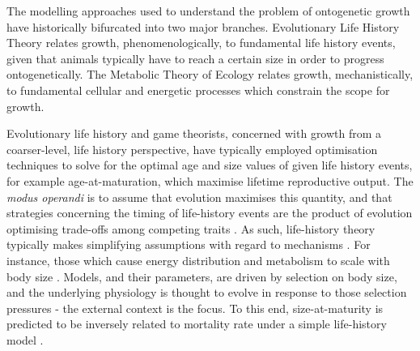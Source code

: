 \documentclass[a4paper]{article} %
\begin{document}
    The modelling approaches used to understand the problem of ontogenetic growth have historically bifurcated into two major branches. Evolutionary Life History Theory relates growth, phenomenologically, to fundamental life history events, given that animals typically have to reach a certain size in order to progress ontogenetically. The Metabolic Theory of Ecology relates growth, mechanistically, to fundamental cellular and energetic processes which constrain the scope for growth.
        
    Evolutionary life history and game theorists, concerned with growth from a coarser-level, life history perspective, have typically employed optimisation techniques to solve for the optimal age and size values of given life history events, for example age-at-maturation, which maximise lifetime reproductive output. The \textit{modus operandi} is to assume that evolution maximises this quantity, and that strategies concerning the timing of life-history events are the product of evolution optimising trade-offs among competing traits \autocite{Day1997, Stearns1989, stearns1992evolution}. As such, life-history theory typically makes simplifying assumptions with regard to mechanisms \autocite{Day1997, Kozowski1987-indeterminate}. For instance, those which cause energy distribution and metabolism to scale with body size \autocite{peters1983,Werner1988,West1997,brown2000-scaling-book}. Models, and their parameters, are driven by selection on body size, and the underlying physiology is thought to evolve in response to those selection pressures - the external context is the focus. To this end, size-at-maturity is predicted to be inversely related to mortality rate under a simple life-history model \autocite{stearns1992evolution}.
        
\end{document}
